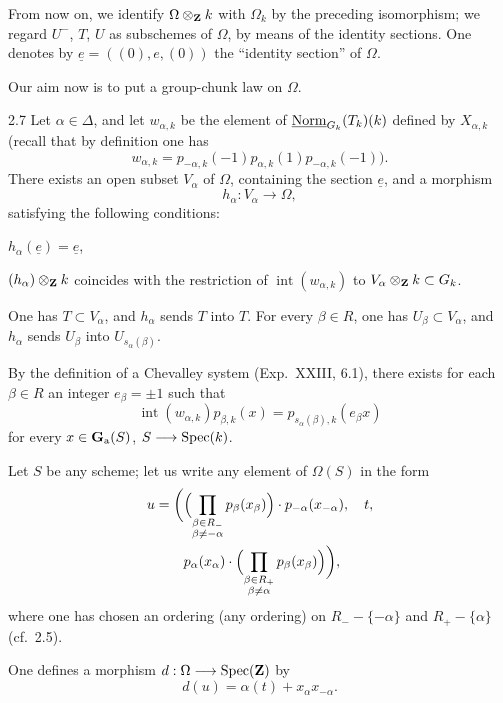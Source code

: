 From now on, we identify $\Omega\otimes_{\mathbf{Z}} k$ with $\Omega_k$ by the preceding isomorphism; we regard $U^-$, $T$, $U$ as subschemes of $\Omega$, by means of the identity sections. One denotes by $\underline e=((0),e,(0))$ the ``identity section'' of $\Omega$.

Our aim now is to put a group-chunk law on $\Omega$.
\begin{lemma}{2.7}\label{XXV.2.7}
Let $\alpha\in\Delta$, and let $w_{\alpha,k}$ be the element of $\underline{\mathrm{Norm}}_{G_k}(T_k)(k)$ defined by $X_{\alpha,k}$ (recall that by definition one has
\[
w_{\alpha,k}=p_{-\alpha,k}(-1)p_{\alpha,k}(1)p_{-\alpha,k}(-1)).
\]
There exists an open subset $V_\alpha$ of $\Omega$, containing the section $\underline e$, and a morphism
\[
h_\alpha:V_\alpha\to\Omega,
\]
satisfying the following conditions:
\begin{enumeratei}
\item $h_\alpha(\underline e)=\underline e$,
\item $(h_\alpha)\otimes_{\mathbf{Z}} k$ coincides with the restriction of $\operatorname{int}(w_{\alpha,k})$ to $V_\alpha\otimes_{\mathbf{Z}} k\subset G_k$.
\item One has $T\subset V_\alpha$, and $h_\alpha$ sends $T$ into $T$. For every $\beta\in R$, one has $U_\beta\subset V_\alpha$, and $h_\alpha$ sends $U_\beta$ into $U_{s_\alpha(\beta)}$.
\end{enumeratei}
\end{lemma}
By the definition of a Chevalley system (Exp.~XXIII, 6.1), there exists for each $\beta\in R$ an integer $e_\beta=\pm1$ such that
\[
\operatorname{int}(w_{\alpha,k})p_{\beta,k}(x)=p_{s_\alpha(\beta),k}(e_\beta x)
\]
for every $x\in\mathbf{G}_{\mathrm{a}}(S)$, $S\longrightarrow\operatorname{Spec}(k)$.

Let $S$ be any scheme; let us write any element of $\Omega(S)$ in the form
\[
\begin{split}
u=\biggl(&\Bigl(\prod_{\substack{\beta\in R_-\\\beta\ne-\alpha}}p_\beta(x_\beta)\Bigr)\cdot p_{-\alpha}(x_{-\alpha}),\quad t,\\
& p_\alpha(x_\alpha)\cdot\Bigl(\prod_{\substack{\beta\in R_+\\\beta\ne\alpha}}p_\beta(x_\beta)\Bigr)\biggr),
\end{split}
\]
where one has chosen an ordering (any ordering) on $R_--\{-\alpha\}$ and $R_+-\{\alpha\}$ (cf.~2.5).

One defines a morphism $d:\Omega\longrightarrow\operatorname{Spec}(\mathbf{Z})$ by
\[
d(u)=\alpha(t)+x_\alpha x_{-\alpha}.
\]

